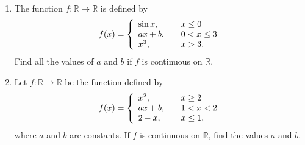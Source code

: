 \documentclass[titlepage,a4paper,12pt]{report}
\begin{document}
\begin{enumerate}
\[\begin{array}{l l}
  Ax-B, & \quad x\leq -1\\
  2x^2+3Ax+B, & \quad -1<x\leq 1\\
  4, & \quad x >1.\\ \end{array} \right. \]
  \item The function $f:\mathbb{R} \to \mathbb{R}$ is defined by 
  \[f(x) = \left\{ 
\begin{array}{l l}
 \sin x, & \quad x\leq 0\\
  ax+b, & \quad 0<x \leq 3\\
  x^3, & \quad x >3.\\ \end{array} \right. \]
  Find all the values of $a$ and $b$ if $f$ is continuous on $\mathbb{R}$.
  \item Let $f:\mathbb{R} \to \mathbb{R}$ be the function defined by 
  \[f(x) = \left\{ 
\begin{array}{l l}
  x^2, & \quad x\geq 2\\
  ax+b, & \quad 1<x<2\\
  2-x, & \quad x\leq 1,\\ \end{array} \right. \]
  where $a$ and $b$ are constants. If $f$ is continuous on $\mathbb{R}$, find the values $a$ and $b$.
\end{enumerate}
\end{document}
